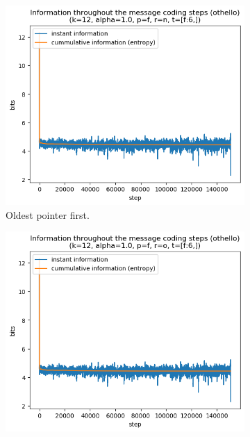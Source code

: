 \documentclass{article}
\begin{document}
\begin{figure}
    \begin{subfigure}[b]{0.3\textwidth}
        \begin{center}
            \includegraphics[width=1.0\linewidth]{../scripts/images/othello_12_1.0_f_n_[f:6,].png}
        \end{center}
        \caption{Oldest pointer first.}
        \label{fig:results-reposition-other-n}
    \end{subfigure}
    \hfill
    \begin{subfigure}[b]{0.3\textwidth}
        \begin{center}
            \includegraphics[width=1.0\linewidth]{../scripts/images/othello_12_1.0_f_o_[f:6,].png}

\end{center}
\end{subfigure}
\end{figure}
\end{document}

